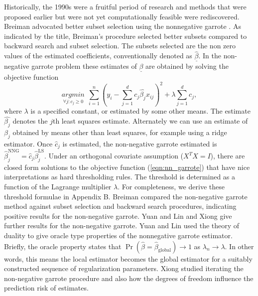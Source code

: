 Historically, the 1990s were a fruitful period of research and methods that were proposed earlier but were not yet computationally feasible were rediscovered. Breiman advocated better subset selection using the nonnegative garrote \cite{breiman1995better,yuan2007non}. As indicated by the title, Breiman's procedure \cite{breiman1995better} selected better subsets compared to backward search and subset selection. The subsets selected are the non zero values of the estimated coefficients, conventionally denoted as $\underline{\hat{\beta}}$. In the non-negative garrote problem these estimates of $\underline{\beta}$ are obtained by solving the objective function 
\begin{equation}\label{eqn:nn_garrote}
\underset{\forall j: c_j\geq 0}{argmin}\ \ \sum_{i=1}^n(y_i -\sum_{j=1}^dc_j\hat{\beta_j}x_{ij})^2 + \lambda\sum_{j=1}^dc_j,
\end{equation}    
where $\lambda$ is a specified constant, or estimated by some other means. The estimate $\hat{\beta_j}$ denotes the $j$th least squares estimate. Alternately we can use an estimate of $\beta_j$ obtained by means other than least squares, for example using a ridge estimator. Once $\hat{c}_j$ is estimated, the non-negative garrote estimated is $\hat{\beta}_j^{\text{NNG}} =\hat{c}_j\hat{\beta}_j^{\text{LS}}$. Under an orthogonal covariate assumption ($X^TX=I$), there are closed form solutions to the objective function (\ref{eqn:nn_garrote}) that have nice interpretations as hard thresholding rules. The threshold is determined as a function of the Lagrange multiplier $\lambda$. For completeness, we derive these threshold formulae in Appendix B. 
Breiman compared the non-negative garrote method against subset selection and backward search procedures, indicating positive results for the non-negative garrote. Yuan and Lin \cite{yuan2007non} and Xiong \cite{xiong2010some} give further results for the non-negative garrote. Yuan and Lin used the theory of duality to give oracle type properties of the nonnegative garrote estimator. Briefly, the oracle property states that $\Pr(\hat{\beta} = \hat{\beta}_{\text{global}})\to 1$ as $\lambda_n\to\lambda$. In other words, this means the local estimator becomes the global estimator for a suitably constructed sequence of regularization parameters. Xiong studied iterating the non-negative garrote procedure and also how the degrees of freedom influence the prediction risk of estimates.    

